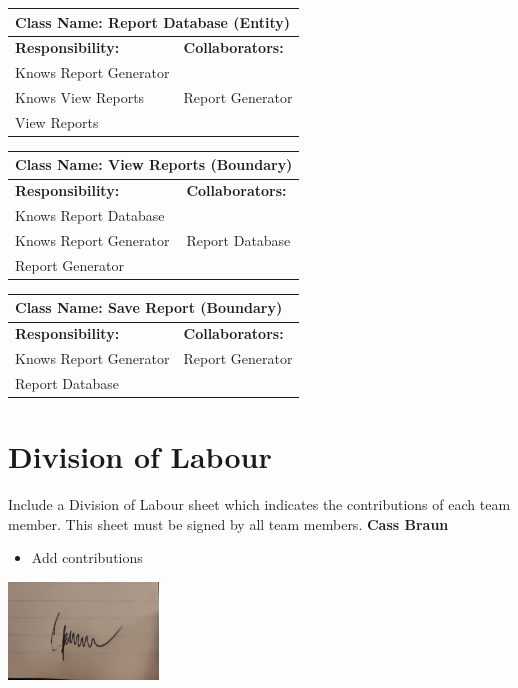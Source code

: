 \documentclass[]{article}
\begin{document}
	\begin{table}[H]
		\centering
		\begin{tabular}{|p{7cm}|p{7cm}|}
		\hline 
		 \multicolumn{2}{|l|}{\textbf{Class Name: Report Database (Entity)}} \\
		\hline
		\textbf{Responsibility:} & \textbf{Collaborators:} \\
		\hline
		Knows Report Generator \\
		Knows View Reports & 		
		Report Generator \\
		View Reports \\
		\hline
		\end{tabular}
	\end{table}
	
	\begin{table}[H]
		\centering
		\begin{tabular}{|p{7cm}|p{7cm}|}
		\hline 
		 \multicolumn{2}{|l|}{\textbf{Class Name: View Reports (Boundary)}} \\
		\hline
		\textbf{Responsibility:} & \textbf{Collaborators:} \\
		\hline
		Knows Report Database \\
		Knows Report Generator & 		
		Report Database \\
		Report Generator \\
		\hline
		\end{tabular}
	\end{table} 	
	
	\begin{table}[H]
		\centering
		\begin{tabular}{|p{7cm}|p{7cm}|}
		\hline 
		 \multicolumn{2}{|l|}{\textbf{Class Name: Save Report (Boundary)}} \\
		\hline
		\textbf{Responsibility:} & \textbf{Collaborators:} \\
		\hline
		Knows Report Generator & 		
		Report Generator \\
		Report Database \\
		\hline
		\end{tabular}
	\end{table}
	
\FloatBarrier

\appendix
\section{Division of Labour}
\label{sec:division_of_labour}
Include a Division of Labour sheet which indicates the contributions of each team member. This sheet must be signed by all team members.
\newline
\newline
\textbf{Cass Braun}
\begin{itemize}
    \setlength\itemindent{2em}
\item Add contributions 
\end{itemize}
\includegraphics[width=0.3\textwidth]{Cass.jpg}
\end{document}
